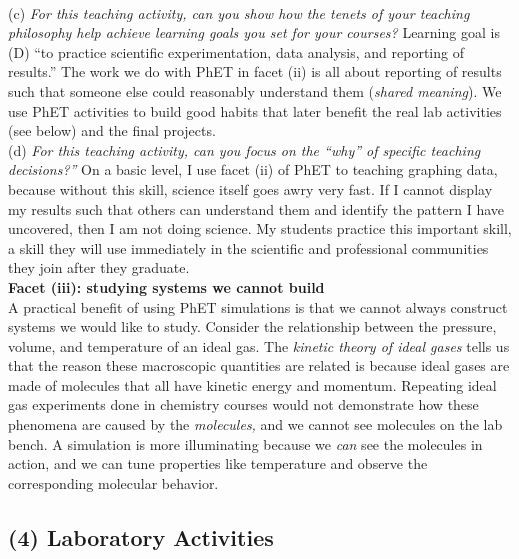 \documentclass[../../../main.tex]{subfiles}
\begin{document}
\\
\vspace{0.25cm}
(c) \textit{For this teaching activity, can you show how the tenets of your teaching philosophy help achieve learning goals you
set for your courses?} Learning goal is (D) ``to practice scientific experimentation, data analysis, and reporting of results.''  The work we do with PhET in facet (ii) is all about reporting of results such that someone else could reasonably understand them (\textit{shared meaning}).  We use PhET activities to build good habits that later benefit the real lab activities (see below) and the final projects.
\\
\vspace{0.25cm}
(d) \textit{For this teaching activity, can you focus on the ``why'' of specific teaching decisions?''}  On a basic level, I use facet (ii) of PhET to teaching graphing data, because without this skill, science itself goes awry very fast.  If I cannot display my results such that others can understand them and identify the pattern I have uncovered, then I am not doing science.  My students practice this important skill, a skill they will use immediately in the scientific and professional communities they join after they graduate.
\\
\vspace{0.25cm}
\textbf{Facet (iii): studying systems we cannot build}
\\
\vspace{0.25cm}
A practical benefit of using PhET simulations is that we cannot always construct systems we would like to study.  Consider the relationship between the pressure, volume, and temperature of an ideal gas.  The \textit{kinetic theory of ideal gases} tells us that the reason these macroscopic quantities are related is because ideal gases are made of molecules that all have kinetic energy and momentum.  Repeating ideal gas experiments done in chemistry courses would not demonstrate how these phenomena are caused by the \textit{molecules,} and we cannot see molecules on the lab bench.  A simulation is more illuminating because we \textit{can} see the molecules in action, and we can tune properties like temperature and observe the corresponding molecular behavior.

\subsection{(4) Laboratory Activities}
\end{document}
